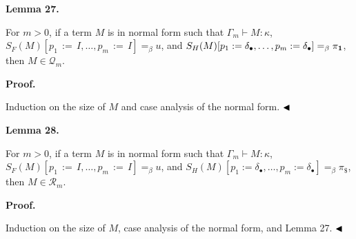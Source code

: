  
 
\par\medskip\noindent\textbf{Lemma 27.}\par
 
 
For $m>0$, if a term $M$ is in normal form such that $\Gamma_{m}\vdash M:\kappa$, $S_{F}(M)[p_{1}{\,:=\,}I,\ldots,p_{m}{\,:=\,}I]=_{\beta}u$, and $S_{H}(M)[p_{1}:=\delta_{\bullet},\ldots,p_{m}:=\delta_{\bullet}]=_{\beta}\pi_{%
\mathbf{1}}$, then $M\in\mathcal{Q}_{m}$.\par
 
 
 
 
\par\medskip\noindent\textbf{Proof.}\par
 
 
Induction on the size of $M$ and case analysis of the normal form. $\hfill\blacktriangleleft$\par
 
 
 
\par\medskip\noindent\textbf{Lemma 28.}\par
 
 
For $m>0$, if a term $M$ is in normal form such that $\Gamma_{m}\vdash M:\kappa$, $S_{F}(M)[p_{1}{\,:=\,}I,\ldots,p_{m}{\,:=\,}I]=_{\beta}u$, and $S_{H}(M)[p_{1}:=\delta_{\bullet},\ldots,p_{m}:=\delta_{\bullet}]=_{\beta}\pi_{\$}$, then $M\in\mathcal{R}_{m}$.\par
 
 
 
 
 
\par\medskip\noindent\textbf{Proof.}\par
 
 
Induction on the size of $M$, case analysis of the normal form, and Lemma 27. $\hfill\blacktriangleleft$\par
 
